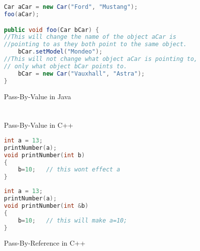 \documentclass[]{report}
\begin{document}
\chapter{}
\begin{figure}[h!]
	\caption{Pass-By-Value in Java}
	\begin{lstlisting}[language=Java,frame=single]
Car aCar = new Car("Ford", "Mustang");
foo(aCar);

public void foo(Car bCar) {
//This will change the name of the object aCar is 
//pointing to as they both point to the same object.
	bCar.setModel("Mondeo");
//This will not change what object aCar is pointing to,
// only what object bCar points to.
	bCar = new Car("Vauxhall", "Astra");
}
	\end{lstlisting}
\end{figure}

\chapter{}
\begin{figure}[h!]
	\caption{Pass-By-Value in C++}
	\begin{lstlisting}[language=C++,frame=single]
int a = 13;
printNumber(a);
void printNumber(int b)
{
	b=10;	// this wont effect a
}
	\end{lstlisting}
	\caption{Pass-By-Reference in C++}
	\begin{lstlisting}[language=C++,frame=single]
int a = 13;
printNumber(a);
void printNumber(int &b)
{
	b=10;	// this will make a=10;
}
	\end{lstlisting}
\end{figure}
\end{document}
